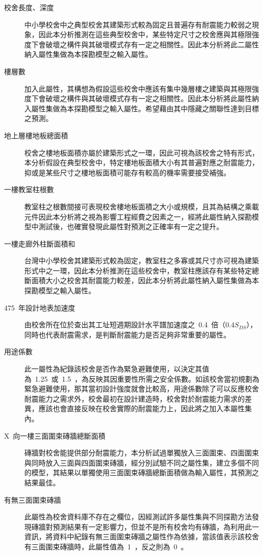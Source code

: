 \begin{description}
  \item[校舍長度、深度]
  中小學校舍中之典型校舍其建築形式較為固定且普遍存有耐震能力較弱之現象，因此本分析推測在這些典型校舍中，某些特定尺寸之校舍應與其極限強度下會破壞之構件與其破壞模式存有一定之相關性。因此本分析將此二屬性納入屬性集做為本探勘模型之輸入屬性。
  \item[樓層數]
  加入此屬性，其構想為假設這些校舍中應該有集中幾層樓之建築與其極限強度下會破壞之構件與其破壞模式存有一定之相關性。因此本分析將此屬性納入屬性集做為本探勘模型之輸入屬性。希望藉由其中隱藏之關聯性達到目標之預測。
  \item[地上層樓地板總面積]
  校舍之樓地板面積亦屬於建築形式之一環，因此可視為該校舍之特有形式，本分析假設在典型校舍中，特定樓地板面積大小有其普遍對應之耐震能力，抑或是某些尺寸之樓地板面積可能存有較高的機率需要接受補強。
  \item[一樓教室柱根數]
  教室柱之根數間接可表現校舍樓地板面積之大小或規模，且其為結構之乘載元件因此本分析將之視為影響工程經費之因素之一，經將此屬性納入探勘模型中測試後，也確實發現此屬性對預測之正確率有一定之提升。
  \item[一樓走廊外柱斷面積和]
  台灣中小學校舍其建築形式較為固定，教室柱之多寡或其尺寸亦可視為建築形式中之一環，因此本分析推測在這些校舍中，教室柱應該存有某些特定總斷面積大小之校舍其耐震能力較差，因此本分析將此屬性納入屬性集做為本探勘模型之輸入屬性。
  \item[475~年設計地表加速度]
  由校舍所在位於查出其工址短週期設計水平譜加速度之~0.4~倍（$0.4S_{DS}$），同時也代表耐震需求，是判斷耐震能力是否足夠非常重要的屬性。
  \item[用途係數]
  此一屬性為紀錄該校舍是否作為緊急避難使用，以決定其值為~1.25~或~1.5~，為反映其因重要性所需之安全係數。如該校舍當初規劃為緊急避難使用，那其當初設計強度就會比較高，用途係數除了可以反應校舍耐震能力之需求外，校舍最初在設計建造時，校舍對於耐震能力需求的差異，應該也會直接反映在校舍實際的耐震能力上，因此將之加入本屬性集內。
  \item[X~向一樓三面圍束磚牆總斷面積]
  磚牆對校舍能提供部分耐震能力，本分析試過單獨放入三面圍束、四面圍束與同時放入三面與四面圍束磚牆，經分別試驗不同之屬性集，建立多個不同的模型，其結果以單獨使用三面圍束磚牆總斷面積做為輸入屬性，其預測之結果最佳。
  \item[有無三面圍束磚牆]
  此屬性為校舍資料庫不存在之欄位，因經測試許多屬性集與不同探勘方法發現磚牆對預測結果有一定影響力，但並不是所有校舍均有磚牆，為利用此一資訊，將資料中紀錄有無三面圍束磚牆之屬性作為依據，當該值表示該校舍有三面圍束磚牆時，此屬性值為~1~，反之則為~0~。

\end{description}
